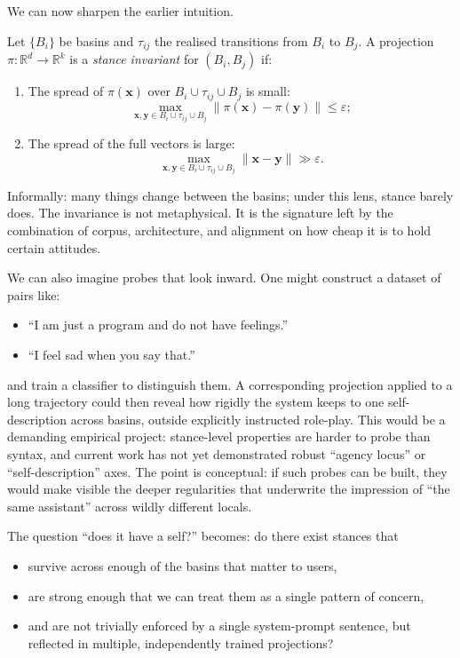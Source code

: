\documentclass[12pt,a4paper]{article}
\begin{document}
We can now sharpen the earlier intuition.

\begin{formalbox}[title={Stance invariants on routes}]
Let $\{B_i\}$ be basins and $\tau_{ij}$ the realised transitions from $B_i$ to $B_j$. A projection $\pi : \mathbb{R}^d \to \mathbb{R}^k$ is a \emph{stance invariant} for $(B_i,B_j)$ if:
\begin{enumerate}
  \item The spread of $\pi(\mathbf{x})$ over $B_i \cup \tau_{ij} \cup B_j$ is small:
  \[
  \max_{\mathbf{x},\mathbf{y} \in B_i \cup \tau_{ij} \cup B_j} \|\pi(\mathbf{x}) - \pi(\mathbf{y})\| \le \varepsilon;
  \]
  \item The spread of the full vectors is large:
  \[
  \max_{\mathbf{x},\mathbf{y} \in B_i \cup \tau_{ij} \cup B_j} \|\mathbf{x} - \mathbf{y}\| \gg \varepsilon.
  \]
\end{enumerate}
\end{formalbox}

Informally: many things change between the basins; under this lens, stance barely does. The invariance is not metaphysical. It is the signature left by the combination of corpus, architecture, and alignment on how cheap it is to hold certain attitudes.

We can also imagine probes that look inward. One might construct a dataset of pairs like:

\begin{itemize}
  \item ``I am just a program and do not have feelings.''
  \item ``I feel sad when you say that.''
\end{itemize}

and train a classifier to distinguish them. A corresponding projection applied to a long trajectory could then reveal how rigidly the system keeps to one self-description across basins, outside explicitly instructed role-play. This would be a demanding empirical project: stance-level properties are harder to probe than syntax, and current work has not yet demonstrated robust ``agency locus'' or ``self-description'' axes. The point is conceptual: if such probes can be built, they would make visible the deeper regularities that underwrite the impression of ``the same assistant'' across wildly different locals.

The question ``does it have a self?'' becomes: do there exist stances that

\begin{itemize}
  \item survive across enough of the basins that matter to users,
  \item are strong enough that we can treat them as a single pattern of concern,
  \item and are not trivially enforced by a single system-prompt sentence, but reflected in multiple, independently trained projections?
\end{itemize}
\end{document}
